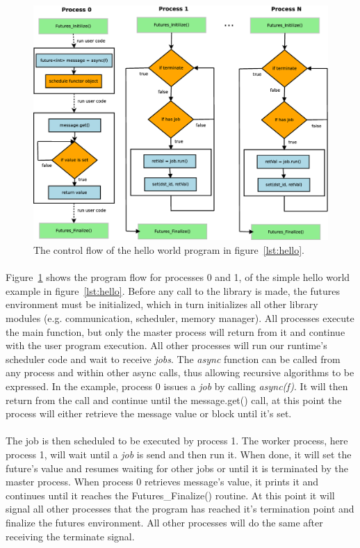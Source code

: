 \begin{figure}[!ht]
\includegraphics[width=\columnwidth]{figures/hello_flow}
\caption{
The control flow of the hello world program in figure~\ref{lst:hello}.}
\label{fig:helloCF}
\end{figure}

\paragraph{}
Figure~\ref{fig:helloCF} shows the program flow for processes 0 and 1, of the simple
hello world example in figure~\ref{lst:hello}.  Before any call to the library is made, the futures
environment must be initialized, which in turn initializes all other library modules 
(e.g. communication, scheduler, memory manager).
All processes execute the main function, but only
the master process will return from it and continue with the user program execution.
All other processes will run our runtime's scheduler code and wait to receive \emph{jobs}.
The \emph{async} function can be called from any process 
and within other async calls, thus allowing recursive algorithms to be expressed. 
In the example, process 0 issues a \emph{job} by
calling \emph{async(f)}.  It will then return from the call and continue until
the message.get() call, at this point the process will either retrieve the message value or block until
it's set.

\paragraph{}
The job is then scheduled to be executed by process 1.  The worker process,
here process 1, will wait until a \emph{job} is send and then run it.  When done, it will set 
the future's value and resumes waiting for other jobs or until it is terminated by the master
process.  When process 0 retrieves message's value, it prints it and continues until it reaches
the Futures\_Finalize() routine.  At this point it will signal all other processes that the program
has reached it's termination point and finalize the futures environment.  All other processes will
do the same after receiving the terminate signal.

